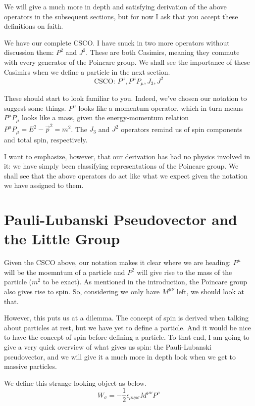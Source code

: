 \documentclass[12pt]{article}
\begin{document}
We will give a much more in depth and satisfying derivation of the above operators in the subsequent sections, but for now I ask that you accept these definitions on faith.

We have our complete CSCO. I have snuck in two more operators without discussion them: $P^2$ and $J^2$. These are both Casimirs, meaning they commute with every generator of the Poincare group. We shall see the importance of these Casimirs when we define a particle in the next section.
\begin{equation}
    \text{CSCO: } P^\mu, P^\mu P_\mu, J_3, J^2
\end{equation}

These should start to look familiar to you. Indeed, we've chosen our notation to suggest some things. $P^\mu$ looks like a momentum operator, which in turn means $P^\mu P_\mu$ looks like a mass, given the energy-momentum relation $P^\mu P_\mu = E^2-\vec{p}^2=m^2$. The $J_3$ and $J^2$ operators remind us of spin components and total spin, respectively.

I want to emphasize, however, that our derivation has had no physics involved in it: we have simply been classifying representations of the Poincare group. We shall see that the above operators do act like what we expect given the notation we have assigned to them.

\section{Pauli-Lubanski Pseudovector and the Little Group}


Given the CSCO above, our notation makes it clear where we are heading: $P^\mu$ will be the moemntum of a particle and $P^2$ will give rise to the mass of the particle ($m^2$ to be exact). As mentioned in the introduction, the Poincare group also gives rise to spin. So, considering we only have $M^{\mu\nu}$ left, we should look at that.

However, this puts us at a dilemma. The concept of spin is derived when talking about particles at rest, but we have yet to define a particle. And it would be nice to have the concept of spin before defining a particle. To that end, I am going to give a very quick overview of what gives us spin: the Pauli-Lubanski pseudovector, and we will give it a much more in depth look when we get to massive particles.

We define this strange looking object as below.
\begin{equation}
    W_\sigma=-\frac{1}{2}\epsilon_{\mu\nu\rho\sigma} M^{\mu\nu}P^\rho
\end{equation}
\end{document}

